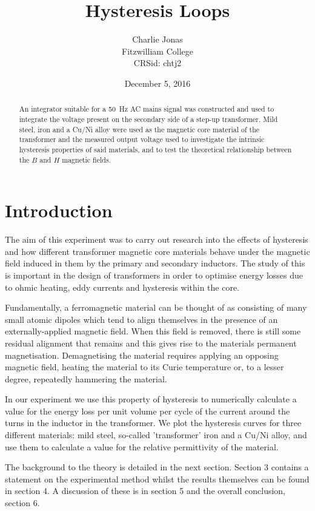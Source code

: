 \documentclass[12pt]{article}
\title{Hysteresis Loops}
\author{Charlie Jonas\\Fitzwilliam College\\CRSid: chtj2}
\date{December 5, 2016}
\begin{document}
\maketitle

\begin{abstract}
An integrator suitable for a \SI{50}{\hertz} AC mains signal was constructed and used to integrate the voltage present on the secondary side of a step-up transformer. Mild steel, iron and a Cu/Ni alloy were used as the magnetic core material of the transformer and the measured output voltage used to investigate the intrinsic hysteresis properties of said materials, and to test the theoretical relationship between the $B$ and $H$ magnetic fields.
\end{abstract}




\section{Introduction}
The aim of this experiment was to carry out research into the effects of hysteresis and how different transformer magnetic core materials behave under the magnetic field induced in them by the primary and secondary inductors. The study of this is important in the design of transformers in order to optimise energy losses due to ohmic heating, eddy currents and hysteresis within the core.

Fundamentally, a ferromagnetic material can be thought of as consisting of many small atomic dipoles which tend to align themselves in the presence of an externally-applied magnetic field. When this field is removed, there is still some residual alignment that remains and this gives rise to the materials permanent magnetisation. Demagnetising the material requires applying an opposing magnetic field, heating the material to its Curie temperature or, to a lesser degree, repeatedly hammering the material.

In our experiment we use this property of hysteresis to numerically calculate a value for the energy loss per unit volume per cycle of the current around the turns in the inductor in the transformer. We plot the hysteresis curves for three different materials: mild steel, so-called 'transformer' iron and a Cu/Ni alloy, and use them to calculate a value for the relative permittivity of the material.

The background to the theory is detailed in the next section. Section 3 contains a statement on the experimental method whilst the results themselves can be found in section 4. A discussion of these is in section 5 and the overall conclusion, section 6.
\end{document}
